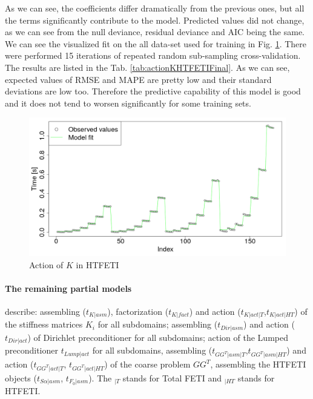 As we can see, the coefficients differ dramatically from the previous 
ones, but all the terms significantly contribute to the model. Predicted
values did not change, as we can see from the null deviance, residual
deviance and AIC being the same. We can see the visualized fit on the all 
data-set used for training in Fig. \ref{fig:actionK-HTFETI}. There were performed 15 iterations of repeated random sub-sampling cross-validation. The results are 
listed in the Tab. 
\ref{tab:actionKHTFETIFinal}.
As we can see, expected values of RMSE and MAPE are pretty low and their 
standard deviations are low too. Therefore the predictive capability of this
model is good and it does not tend to worsen significantly for some 
training sets.


\begin{figure}[htb]
\centering
\includegraphics[scale=0.22]{figures/actionK-HTFETI.png}
\caption{Action of $K$ in HTFETI}
\label{fig:actionK-HTFETI}
\end{figure}

\paragraph{The remaining partial models} describe:  %
assembling ($t_{K|asm}$), factorization ($t_{K|fact}$) and action ($t_{K|act|T}$,$t_{K|act|HT}$) of the stiffness matrices $K_i$ for all subdomains; assembling ($t_{Dir|asm}$) and action ($t_{Dir|act}$) of Dirichlet preconditioner for all subdomains; action of the Lumped preconditioner $t_{Lump|act}$ for all subdomains, assembling ($t_{GG^T|asm|T}$,$t_{GG^T|asm|HT}$) and action ($t_{GG^T|act|T}$, $t_{GG^T|act|HT}$) of the coarse problem $GG^T$, assembling the HTFETI objects ($t_{S\alpha|asm}$, $t_{F_0|asm}$). The $_{|T}$ stands for  Total FETI and $_{|HT}$ stands for HTFETI. 